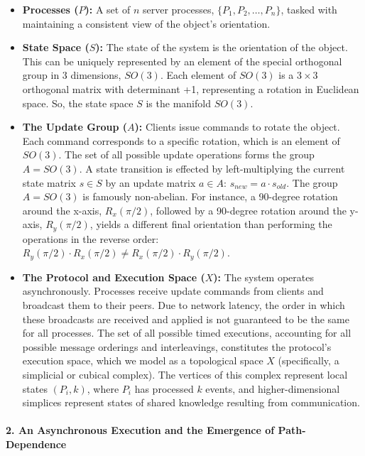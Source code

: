 \documentclass[
]{article}
\providecommand{\tightlist}{%
  \setlength{\itemsep}{0pt}\setlength{\parskip}{0pt}}
\begin{document}
\begin{itemize}
\tightlist
\item
  \textbf{Processes (\(P\)):} A set of \(n\) server processes,
  \(\{P_1, P_2, \dots, P_n\}\), tasked with maintaining a consistent
  view of the object's orientation.
\item
  \textbf{State Space (\(S\)):} The state of the system is the
  orientation of the object. This can be uniquely represented by an
  element of the special orthogonal group in 3 dimensions, \(SO(3)\).
  Each element of \(SO(3)\) is a \(3 \times 3\) orthogonal matrix with
  determinant +1, representing a rotation in Euclidean space. So, the
  state space \(S\) is the manifold \(SO(3)\).
\item
  \textbf{The Update Group (\(A\)):} Clients issue commands to rotate
  the object. Each command corresponds to a specific rotation, which is
  an element of \(SO(3)\). The set of all possible update operations
  forms the group \(A = SO(3)\). A state transition is effected by
  left-multiplying the current state matrix \(s \in S\) by an update
  matrix \(a \in A\): \(s_{new} = a \cdot s_{old}\). The group
  \(A=SO(3)\) is famously non-abelian. For instance, a 90-degree
  rotation around the x-axis, \(R_x(\pi/2)\), followed by a 90-degree
  rotation around the y-axis, \(R_y(\pi/2)\), yields a different final
  orientation than performing the operations in the reverse order:
  \(R_y(\pi/2) \cdot R_x(\pi/2) \neq R_x(\pi/2) \cdot R_y(\pi/2)\).
\item
  \textbf{The Protocol and Execution Space (\(X\)):} The system operates
  asynchronously. Processes receive update commands from clients and
  broadcast them to their peers. Due to network latency, the order in
  which these broadcasts are received and applied is not guaranteed to
  be the same for all processes. The set of all possible timed
  executions, accounting for all possible message orderings and
  interleavings, constitutes the protocol's execution space, which we
  model as a topological space \(X\) (specifically, a simplicial or
  cubical complex). The vertices of this complex represent local states
  \((P_i, k)\), where \(P_i\) has processed \(k\) events, and
  higher-dimensional simplices represent states of shared knowledge
  resulting from communication.
\end{itemize}

\paragraph{2. An Asynchronous Execution and the Emergence of
Path-Dependence}\label{an-asynchronous-execution-and-the-emergence-of-path-dependence}
\end{document}
